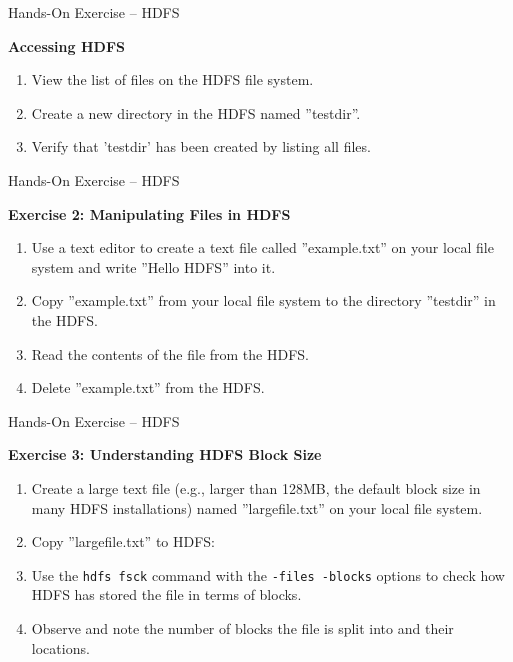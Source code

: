 \documentclass[ignorenonframetext,xcolor=x11names]{beamer}
\begin{document}
\begin{frame}{Hands-On Exercise -- HDFS} 

\textbf{Accessing HDFS}

\begin{enumerate}
  \item View the list of files on the HDFS file system.
  \item Create a new directory in the HDFS named ''testdir''.
  \item Verify that 'testdir' has been created by listing all files.
\end{enumerate}
\end{frame}

\begin{frame}{Hands-On Exercise -- HDFS} 

\textbf{Exercise 2: Manipulating Files in HDFS}

\begin{enumerate}
  \item Use a text editor to create a text file called ''example.txt'' on your local file system and write ''Hello HDFS'' into it.
  \item Copy ''example.txt'' from your local file system to the directory ''testdir'' in the HDFS.
  \item Read the contents of the file from the HDFS.
  \item Delete ''example.txt'' from the HDFS.
\end{enumerate}
\end{frame}

\begin{frame}{Hands-On Exercise -- HDFS} 

\textbf{Exercise 3: Understanding HDFS Block Size}

\begin{enumerate}
  \item Create a large text file (e.g., larger than 128MB, the default block size in many HDFS installations) named ''largefile.txt'' on your local file system.
  \item Copy ''largefile.txt'' to HDFS:
  \item Use the \texttt{hdfs fsck} command with the \texttt{-files -blocks} options to check how HDFS has stored the file in terms of blocks.
  \item Observe and note the number of blocks the file is split into and their locations.
\end{enumerate}
\end{frame}
\end{document}
